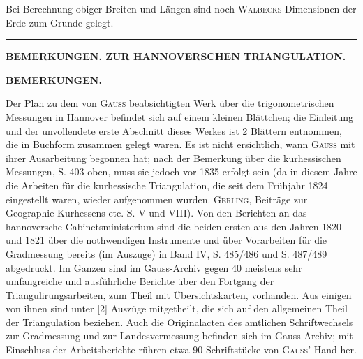 \par\noindent\hspace*{\parindent}Bei Berechnung obiger Breiten und Längen sind noch \textsc{Walbecks} Dimensionen der Erde zum Grunde gelegt.
\begin{center}\rule{2.6cm}{0.4pt}\end{center}

\par\clearpage
\noindent\null\hfill{\small\textbf{BEMERKUNGEN. ZUR HANNOVERSCHEN TRIANGULATION.}}\hfill{}\par\medskip
\begin{center}\textbf{BEMERKUNGEN.}\end{center}
\begingroup\small
\par\noindent\hspace*{\parindent}Der Plan zu dem von \textsc{Gauss} beabsichtigten Werk über die trigonometrischen Messungen in Hannover befindet sich auf einem kleinen Blättchen; die Einleitung und der unvollendete erste Abschnitt dieses Werkes ist 2 Blättern entnommen, die in Buchform zusammen gelegt waren. Es ist nicht ersichtlich, wann \textsc{Gauss} mit ihrer Ausarbeitung begonnen hat; nach der Bemerkung über die kurhessischen Messungen, S. 403 oben, muss sie jedoch vor 1835 erfolgt sein (da in diesem Jahre die Arbeiten für die kurhessische Triangulation, die seit dem Frühjahr 1824 eingestellt waren, wieder aufgenommen wurden. \textsc{Gerling}, Beiträge zur Geographie Kurhessens etc. S. V und VIII). Von den Berichten an das hannoversche Cabinetsministerium sind die beiden ersten aus den Jahren 1820 und 1821 über die nothwendigen Instrumente und über Vorarbeiten für die Gradmessung bereits (im Auszuge) in Band IV, S. 485/486 und S. 487/489 abgedruckt. Im Ganzen sind im Gauss-Archiv gegen 40 meistens sehr umfangreiche und ausführliche Berichte über den Fortgang der Triangulirungsarbeiten, zum Theil mit Übersichtskarten, vorhanden. Aus einigen von ihnen sind unter [2] Auszüge mitgetheilt, die sich auf den allgemeinen Theil der Triangulation beziehen. Auch die Originalacten des amtlichen Schriftwechsels zur Gradmessung und zur Landesvermessung befinden sich im Gauss-Archiv; mit Einschluss der Arbeitsberichte rühren etwa 90 Schriftstücke von \textsc{Gauss}' Hand her.

